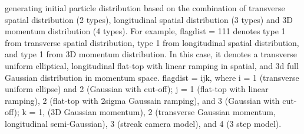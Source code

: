 generating initial particle distribution based on the combination of transverse spatial distribution (2 types), longitudinal spatial distribution (3 types) and 3D momentum distribution (4 types). For example, flagdist = 111 denotes type 1 from transverse spatial distribution, type 1 from longitudinal spatial distribution, and type 1 from 3D momentum distribution. In this case, it denotes a transverse uniform elliptical, longitudinal flat-\/top with linear ramping in spatial, and 3d full Gaussian distribution in momentum space. flagdist = ijk, where i = 1 (transverse uniform ellipse) and 2 (Gaussian with cut-\/off); j = 1 (flat-\/top with linear ramping), 2 (flat-\/top with 2sigma Gaussain ramping), and 3 (Gaussian with cut-\/off); k = 1, (3D Gaussian momentum), 2 (transverse Gaussian momentum, longitudinal semi-\/\+Gaussian), 3 (streak camera model), and 4 (3 step model). 

